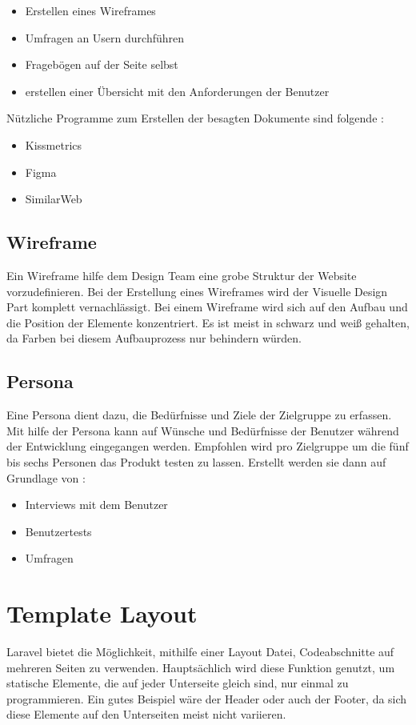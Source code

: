 \begin{itemize}
	\item Erstellen eines Wireframes 
	\item Umfragen an Usern durchführen
	\item Fragebögen auf der Seite selbst 
	\item erstellen einer Übersicht mit den Anforderungen der Benutzer
\end{itemize}
Nützliche Programme zum Erstellen der besagten Dokumente  sind folgende : 
\begin{itemize}
	\item Kissmetrics
	\item Figma
	\item SimilarWeb
\end{itemize}

\subsection{Wireframe}
Ein Wireframe hilfe dem Design Team eine grobe Struktur der Website vorzudefinieren. Bei der Erstellung eines Wireframes wird der Visuelle Design Part komplett vernachlässigt. Bei einem Wireframe wird sich auf den Aufbau und die Position der Elemente konzentriert. Es ist meist in schwarz und weiß gehalten, da Farben bei diesem Aufbauprozess nur behindern würden. 
\subsection{Persona}
Eine Persona dient dazu, die Bedürfnisse und Ziele der Zielgruppe zu erfassen. Mit hilfe der Persona kann auf Wünsche und Bedürfnisse der Benutzer während der Entwicklung eingegangen werden. Empfohlen wird pro Zielgruppe um die fünf bis sechs Personen das Produkt testen zu lassen. Erstellt werden sie dann auf Grundlage von :
\begin{itemize}
	\item Interviews mit dem Benutzer
	\item Benutzertests
	\item Umfragen
\end{itemize}

\section{Template Layout}
Laravel bietet die Möglichkeit, mithilfe einer Layout Datei, Codeabschnitte auf mehreren Seiten zu verwenden. Hauptsächlich wird diese Funktion genutzt, um statische Elemente, die auf jeder Unterseite gleich sind, nur einmal zu programmieren. Ein gutes Beispiel wäre der Header oder auch der Footer, da sich diese Elemente auf den Unterseiten meist nicht variieren. 

